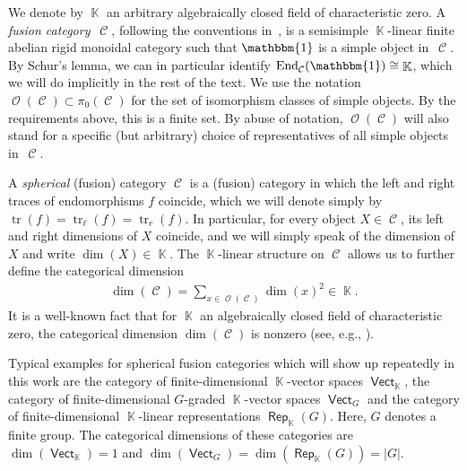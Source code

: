 \documentclass[pdftex]{sigma}
\DeclareMathOperator{\End}{End}
\DeclareMathOperator{\tr}{tr}
\DeclareMathOperator{\vect}{\mathsf{Vect}}
\DeclareMathOperator{\Rep}{\mathsf{Rep}}
\DeclareMathOperator{\K}{\mathbb{K}}
\DeclareMathOperator{\calc}{\mathcal{C}}
\DeclareMathOperator{\calo}{\mathcal{O}}
\numberwithin{equation}{section}
\theoremstyle{definition}
\begin{document}
We denote by $\K$ an arbitrary algebraically closed field of characteristic zero. A \textit{fusion category}~$\calc$, following the conventions in~\cite{EGNO}, is a semisimple $\K$-linear finite abelian rigid monoidal category such that $\mathbbm{1}$ is a simple object in~$\calc$. By Schur's lemma, we can in particular identify $\End_{\calc}(\mathbbm{1}) \cong \K$, which we will do implicitly in the rest of the text. We use the notation $\calo(\calc) \subset \pi_0(\calc)$ for the set of isomorphism classes of simple objects. By the requirements above, this is a finite set. By abuse of notation, $\calo(\calc)$ will also stand for a specific (but arbitrary) choice of representatives of all simple objects in~$\calc$.

A \textit{spherical} (fusion) category $\calc$ is a (fusion) category in which the left and right traces of endomorphisms $f$ coincide, which we will denote simply by $\tr(f) = \tr_{\ell}(f) = \tr_r(f)$. In particular, for every object $X \in \calc$, its left and right dimensions of $X$ coincide, and we will simply speak of the dimension of $X$ and write $\dim(X) \in \K$.
The $\K$-linear structure on $\calc$ allows us to further define the categorical dimension
\begin{align*}
 \dim(\calc) = \sum_{x \in \calo(\calc)}\dim(x)^2 \in \K.
\end{align*}
It is a well-known fact that for $\K$ an algebraically closed field of characteristic zero, the categorical dimension $\dim(\calc)$ is nonzero (see, e.g., \cite[Theorem~7.21.12]{EGNO}).

Typical examples for spherical fusion categories which will show up repeatedly in this work are the category of finite-dimensional $\K$-vector spaces $\vect_{\K}$, the category of finite-dimensional $G$-graded $\K$-vector spaces $\vect_G$ and the category of finite-dimensional $\K$-linear representations $\Rep_{\K}(G)$. Here, $G$ denotes a finite group. The categorical dimensions of these categories are $\dim(\vect_{\K}) = 1$ and $\dim(\vect_G) = \dim(\Rep_{\K}(G)) = |G|$.
\end{document}
